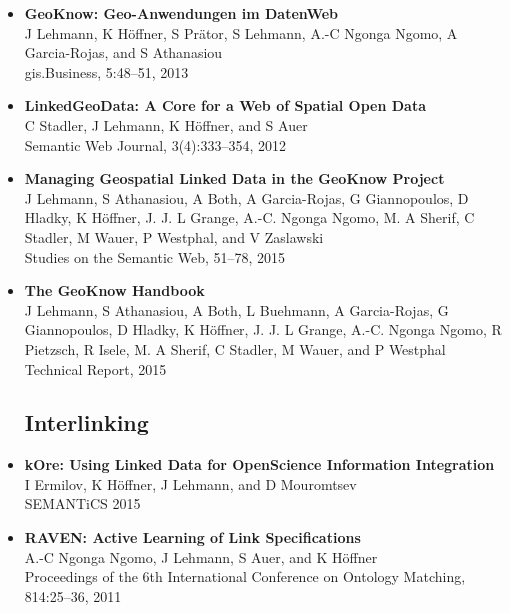 \begin{itemize}
\item \textbf{GeoKnow: {G}eo-{A}nwendungen im {D}aten{W}eb}~\citep{geoknow_business}\\
J Lehmann, K Höffner, S Prätor, S Lehmann, A.-C Ngonga Ngomo, A Garcia-Rojas, and S Athanasiou\\
gis.Business, 5:48--51, 2013

\item \textbf{LinkedGeoData: A Core for a Web of Spatial Open Data}~\citep{SLHA11}\\
C Stadler, J Lehmann, K Höffner, and S Auer\\
Semantic Web Journal, 3(4):333--354, 2012

\item \textbf{Managing Geospatial Linked Data in the GeoKnow Project}~\citep{ios_geoknow_chapter}\\
J Lehmann, S Athanasiou, A Both, A Garcia-Rojas, G Giannopoulos,
D Hladky, K Höffner, J. J. L Grange, A.-C. Ngonga Ngomo, M. A Sherif, C Stadler,
M Wauer, P Westphal, and V Zaslawski\\
Studies on the Semantic Web, 51--78, 2015

\item \textbf{The GeoKnow Handbook}~\citep{geoknow_handbook}\\
J Lehmann, S Athanasiou, A Both, L Buehmann, A Garcia-Rojas, G Giannopoulos, D Hladky, K Höffner, J. J. L Grange, A.-C. Ngonga Ngomo, R Pietzsch, R Isele, M. A Sherif, C Stadler, M Wauer, and P Westphal\\
Technical Report, 2015


\subsection*{Interlinking}

\item \textbf{kOre: Using Linked Data for OpenScience Information Integration}~\citep{ermilov-i-2015-b}\\
I Ermilov, K Höffner, J Lehmann, and D Mouromtsev\\
SEMANTiCS 2015%

\item \textbf{RAVEN: Active Learning of Link Specifications}~\citep{NGO+11a}\\
A.-C Ngonga Ngomo, J Lehmann, S Auer, and K Höffner\\
Proceedings of the 6th International Conference on Ontology Matching,\\
814:25--36, 2011


\end{itemize}
